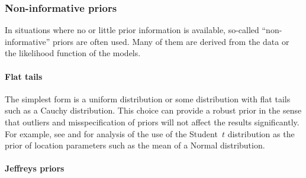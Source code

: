 \subsubsection{Non-informative priors}
\label{ssub:Non-informative priors}

In situations where no or little prior information is available, so-called ``non-informative'' priors are often used. Many of them are derived from the data or the likelihood function of the models.

\paragraph{Flat tails}

The simplest form is a uniform distribution or some distribution with flat tails such as a Cauchy distribution. This choice can provide a robust prior in the sense that outliers and misspecification of priors will not affect the results significantly. For example, see \cite{OHagan:1990vx} and \cite{Fan:1992vx} for analysis of the use of the Student~$t$ distribution as the prior of location parameters such as the mean of a Normal distribution.

\paragraph{Jeffreys priors}

